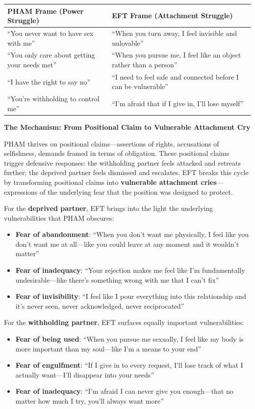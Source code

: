 \documentclass[12pt,openany]{book}
\numberwithin{equation}{chapter}
\begin{document}
\begin{center}
\begin{tabular}{|p{2.5in}|p{2.5in}|}
\hline
\textbf{PHAM Frame (Power Struggle)} & \textbf{EFT Frame (Attachment Struggle)} \\
\hline
``You never want to have sex with me'' & ``When you turn away, I feel invisible and unlovable'' \\
\hline
``You only care about getting your needs met'' & ``When you pursue me, I feel like an object rather than a person'' \\
\hline
``I have the right to say no'' & ``I need to feel safe and connected before I can be vulnerable'' \\
\hline
``You're withholding to control me'' & ``I'm afraid that if I give in, I'll lose myself'' \\
\hline
\end{tabular}
\end{center}

\textbf{The Mechanism: From Positional Claim to Vulnerable Attachment Cry}

PHAM thrives on positional claims---assertions of rights, accusations of selfishness, demands framed in terms of obligation. These positional claims trigger defensive responses: the withholding partner feels attacked and retreats further; the deprived partner feels dismissed and escalates. EFT breaks this cycle by transforming positional claims into \textbf{vulnerable attachment cries}---expressions of the underlying fear that the position was designed to protect.

For the \textbf{deprived partner}, EFT brings into the light the underlying vulnerabilities that PHAM obscures:
\begin{itemize}
    \item \textbf{Fear of abandonment}: ``When you don't want me physically, I feel like you don't want me at all---like you could leave at any moment and it wouldn't matter''
    \item \textbf{Fear of inadequacy}: ``Your rejection makes me feel like I'm fundamentally undesirable---like there's something wrong with me that I can't fix''
    \item \textbf{Fear of invisibility}: ``I feel like I pour everything into this relationship and it's never seen, never acknowledged, never reciprocated''
\end{itemize}

For the \textbf{withholding partner}, EFT surfaces equally important vulnerabilities:
\begin{itemize}
    \item \textbf{Fear of being used}: ``When you pursue me sexually, I feel like my body is more important than my soul---like I'm a means to your end''
    \item \textbf{Fear of engulfment}: ``If I give in to every request, I'll lose track of what I actually want---I'll disappear into your needs''
    \item \textbf{Fear of inadequacy}: ``I'm afraid I can never give you enough---that no matter how much I try, you'll always want more''
\end{itemize}
\end{document}
